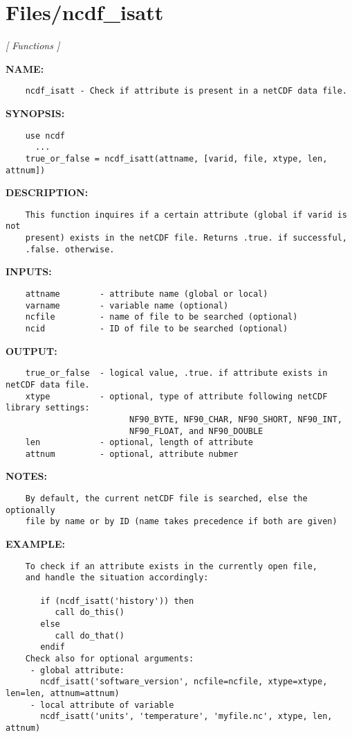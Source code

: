 \section{Files/ncdf\_isatt}
\textsl{[ Functions ]}

\label{ch:robo61}
\label{ch:Files_ncdf_isatt}
\textbf{NAME:}\hspace{0.08in}\begin{Verbatim}
    ncdf_isatt - Check if attribute is present in a netCDF data file.
\end{Verbatim}
\textbf{SYNOPSIS:}\hspace{0.08in}\begin{Verbatim}
    use ncdf
      ...
    true_or_false = ncdf_isatt(attname, [varid, file, xtype, len, attnum])
\end{Verbatim}
\textbf{DESCRIPTION:}\hspace{0.08in}\begin{Verbatim}
    This function inquires if a certain attribute (global if varid is not
    present) exists in the netCDF file. Returns .true. if successful,
    .false. otherwise.
\end{Verbatim}
\textbf{INPUTS:}\hspace{0.08in}\begin{Verbatim}
    attname        - attribute name (global or local)
    varname        - variable name (optional)
    ncfile         - name of file to be searched (optional)
    ncid           - ID of file to be searched (optional)
\end{Verbatim}
\textbf{OUTPUT:}\hspace{0.08in}\begin{Verbatim}
    true_or_false  - logical value, .true. if attribute exists in netCDF data file.
    xtype          - optional, type of attribute following netCDF library settings:
                         NF90_BYTE, NF90_CHAR, NF90_SHORT, NF90_INT,
                         NF90_FLOAT, and NF90_DOUBLE
    len            - optional, length of attribute
    attnum         - optional, attribute nubmer
\end{Verbatim}
\textbf{NOTES:}\hspace{0.08in}\begin{Verbatim}
    By default, the current netCDF file is searched, else the optionally
    file by name or by ID (name takes precedence if both are given)
\end{Verbatim}
\textbf{EXAMPLE:}\hspace{0.08in}\begin{Verbatim}
    To check if an attribute exists in the currently open file,
    and handle the situation accordingly:

       if (ncdf_isatt('history')) then
          call do_this()
       else
          call do_that()
       endif
    Check also for optional arguments:
     - global attribute:
       ncdf_isatt('software_version', ncfile=ncfile, xtype=xtype, len=len, attnum=attnum)
     - local attribute of variable
       ncdf_isatt('units', 'temperature', 'myfile.nc', xtype, len, attnum)
\end{Verbatim}

